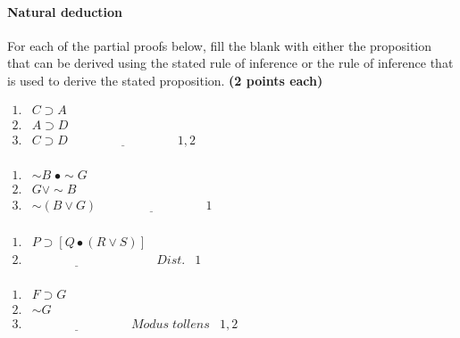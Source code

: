 \documentclass[10pt]{article}
\begin{document}
\begin{enumerate}
\begin{multicols}{2}
  \end{multicols}
  \vspace{4cm} 

\paragraph{Natural deduction}

For each of the partial proofs below, fill the blank with either the proposition that can be derived using the stated rule of inference or the rule of inference that is used to derive the stated proposition. \textbf{(2 points each)}

\setlength\itemsep{1cm}
  \begin{multicols}{2}
  \item $\begin{array}{llll}
         1. & C \supset A & & \\
         2. & A \supset D & & \\
         3. & C \supset D & \underline{\hspace{3cm}} & 1,2 \\
        \end{array}$
  
  \item $\begin{array}{llll}
         1. & \sim\! B\; \bullet \sim\! G & & \\
         2. & G \vee \sim\! B & \\
         3. & \sim (B \vee G) & \underline{\hspace{3cm}} & 1 \\
        \end{array}$
        
  \item $\begin{array}{llll}
         1. & P \supset [Q \bullet (R \vee S)] & & \\
         2. & \underline{\hspace{3cm}} & Dist. & 1 \\
        \end{array}$

  \item $\begin{array}{llll}
         1. & F \supset G & & \\
         2. & \sim\! G \\
         3. & \underline{\hspace{3cm}} & Modus\; tollens & 1,2 \\
        \end{array}$
  \end{multicols}


\end{enumerate}
\end{document}

